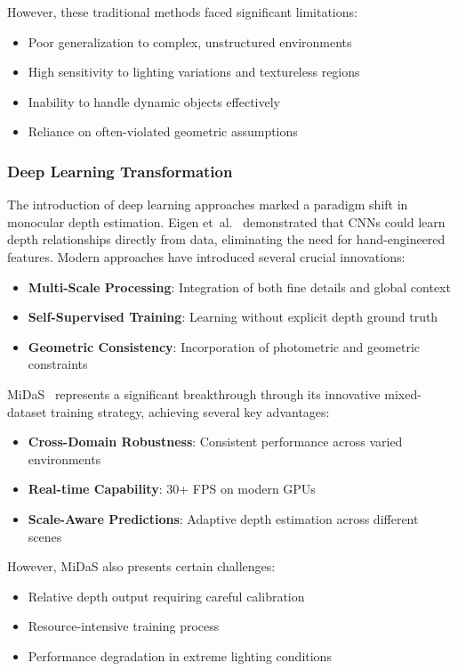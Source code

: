 \documentclass[12pt,oneside]{book}
\begin{document}
However, these traditional methods faced significant limitations:
\begin{itemize}
    \item Poor generalization to complex, unstructured environments
    \item High sensitivity to lighting variations and textureless regions
    \item Inability to handle dynamic objects effectively
    \item Reliance on often-violated geometric assumptions
\end{itemize}

\subsubsection{Deep Learning Transformation}
The introduction of deep learning approaches marked a paradigm shift in monocular depth estimation. Eigen et~al.~\cite{eigen2014depth} demonstrated that CNNs could learn depth relationships directly from data, eliminating the need for hand-engineered features. Modern approaches have introduced several crucial innovations:

\begin{itemize}
    \item \textbf{Multi-Scale Processing}: Integration of both fine details and global context
    \item \textbf{Self-Supervised Training}: Learning without explicit depth ground truth
    \item \textbf{Geometric Consistency}: Incorporation of photometric and geometric constraints
\end{itemize}

MiDaS~\cite{ranftl2020towards} represents a significant breakthrough through its innovative mixed-dataset training strategy, achieving several key advantages:

\begin{itemize}
    \item \textbf{Cross-Domain Robustness}: Consistent performance across varied environments
    \item \textbf{Real-time Capability}: 30+ FPS on modern GPUs
    \item \textbf{Scale-Aware Predictions}: Adaptive depth estimation across different scenes
\end{itemize}

However, MiDaS also presents certain challenges:
\begin{itemize}
    \item Relative depth output requiring careful calibration
    \item Resource-intensive training process
    \item Performance degradation in extreme lighting conditions
\end{itemize}
\end{document}
